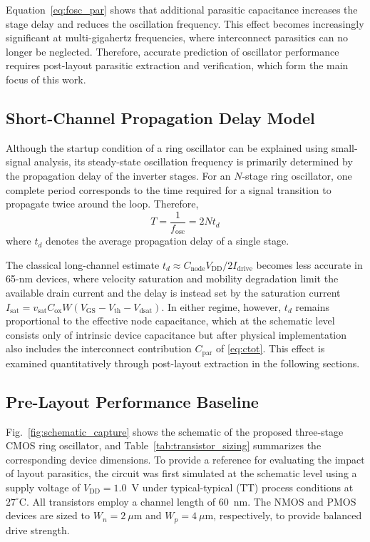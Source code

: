 \documentclass[conference,a4paper]{IEEEtran} %
\begin{document}
Equation~\eqref{eq:fosc_par} shows that additional parasitic capacitance
increases the stage delay and reduces the oscillation frequency. This effect
becomes increasingly significant at multi-gigahertz frequencies, where
interconnect parasitics can no longer be neglected. Therefore, accurate
prediction of oscillator performance requires post-layout parasitic extraction
and verification, which form the main focus of this work.

\subsection{Short-Channel Propagation Delay Model}
Although the startup condition of a ring oscillator can be explained using
small-signal analysis, its steady-state oscillation frequency is primarily
determined by the propagation delay of the inverter stages. For an $N$-stage ring
oscillator, one complete period corresponds to the time required for a signal
transition to propagate twice around the loop. Therefore,
\begin{equation}\label{eq:period}
T = \frac{1}{f_{\text{osc}}} = 2N t_d
\end{equation}
where $t_d$ denotes the average propagation delay of a single stage.


The classical long-channel estimate $t_d \approx C_{\text{node}}
V_{\text{DD}}/2I_{\text{drive}}$ becomes less accurate in 65-nm devices, where
velocity saturation and mobility degradation limit the available drain current
and the delay is instead set by the saturation current
$I_{\text{sat}} = v_{\text{sat}} C_{\text{ox}} W(V_{\text{GS}} - V_{\text{th}}
- V_{\text{dsat}})$. In either regime, however, $t_d$ remains proportional to
the effective node capacitance, which at the schematic level consists only of
intrinsic device capacitance but after physical implementation also includes
the interconnect contribution $C_{\text{par}}$ of \eqref{eq:ctot}. This effect
is examined quantitatively through post-layout extraction in the following
sections.

\subsection{Pre-Layout Performance Baseline}
Fig.~\ref{fig:schematic_capture} shows the schematic of the proposed three-stage
CMOS ring oscillator, and Table~\ref{tab:transistor_sizing} summarizes the
corresponding device dimensions. To provide a reference for evaluating the
impact of layout parasitics, the circuit was first simulated at the schematic
level using a supply voltage of $V_{\text{DD}} = 1.0$~V under typical-typical
(TT) process conditions at $27^{\circ}$C. All transistors employ a channel
length of 60~nm. The NMOS and PMOS devices are sized to $W_n = 2~\mu$m and $W_p
= 4~\mu$m, respectively, to provide balanced drive strength.
\end{document}

